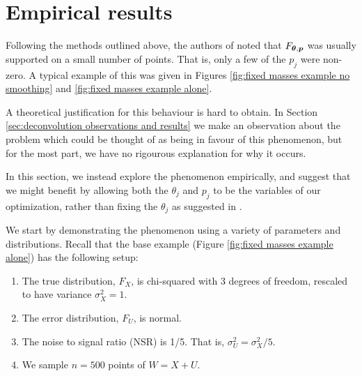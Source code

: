 
\section{Empirical results}
\label{sec:deconvolution empirical results}
	Following the methods outlined above, the authors of \cite{Delaigle2016-la} noted that $F_{{\bm{{\theta}}}, {\bm{{p}}}}$ was usually supported on a small number of points. That is, only a few of the $p_j$ were non-zero. A typical example of this was given in Figures \ref{fig:fixed masses example no smoothing} and \ref{fig:fixed masses example alone}.


	A theoretical justification for this behaviour is hard to obtain. In Section \ref{sec:deconvolution observations and results} we make an observation about the problem which could be thought of as being in favour of this phenomenon, but for the most part, we have no rigourous explanation for why it occurs.

	In this section, we instead explore the phenomenon empirically, and suggest that we might benefit by allowing both the $\theta_j$ and $p_j$ to be the variables of our optimization, rather than fixing the $\theta_j$ as suggested in \cite{Delaigle2016-la}.

	We start by demonstrating the phenomenon using a variety of parameters and distributions. Recall that the base example (Figure \ref{fig:fixed masses example alone}) has the following setup:

	\begin{enumerate}
		\item The true distribution, $F_X$, is chi-squared with 3 degrees of freedom, rescaled to have variance $\sigma_X^2 = 1$.
		\label{enum: true F_X chi-squared}
		\item The error distribution, $F_U$, is normal.
		\label{enum: error F_U normal}
		\item The noise to signal ratio (NSR) is 1/5. That is, $\sigma_U^2 = \sigma_X^2 / 5$.
		\label{enum: NSR 1/5}
		\item We sample $n = 500$ points of $W = X+U$.
		\label{enum: n 500}
	\end{enumerate}

